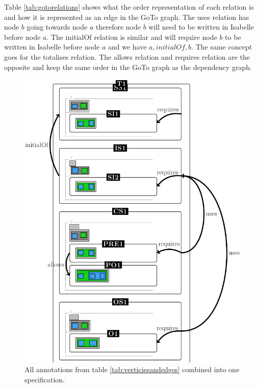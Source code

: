 Table \ref{tab:gotorelations} shows what the order representation of each
relation is and how it is represented as an edge in the GoTo graph. The uses relation
 has node $b$ going towards node $a$ therefore node $b$ will need to be written in
 Isabelle before node $a$. The initialOf relation is similar and will require node
 $b$ to be written in Isabelle before node $a$ and we have $a, initialOf, b$.
 The same concept goes for the totalises relation. 
 The allows relation and requires relation are the opposite and keep the same order in the GoTo graph as
 the dependency graph.

\begin{figure}[H]
\centering
\begin{minipage}{0.45\textwidth}
\centering
\includegraphics[scale=0.3]{Figures/Formalising/draspec.png}
\caption{All annotations from table \ref{tab:verticiesandedges} combined into one specification.  \label{fig:draspeca}}
\end{minipage}\hfill
\begin{minipage}{0.45\textwidth}

\end{minipage}
\end{figure}
